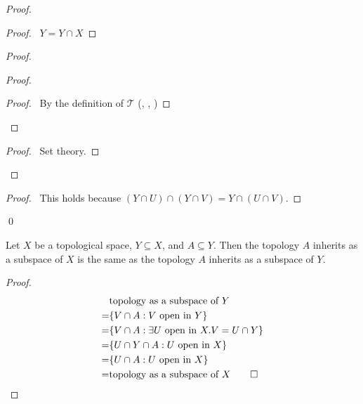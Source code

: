 \begin{proof}
  \pf
  \begin{proof}
    \pf\ $Y = Y \cap X$
  \end{proof}
  \begin{proof}
    \begin{proof}
      \begin{proof}
        \pf\ By the definition of $\mathcal{T}$ (,
        ,
        )
      \end{proof}
    \end{proof}
    \begin{proof}
      \pf\ Set theory.
    \end{proof}
  \end{proof}
  \begin{proof}
    \pf\ This holds because $(Y \cap U) \cap (Y \cap V) = Y \cap (U \cap V)$.
  \end{proof}
  \qed
\end{proof}

\begin{lm}
  Let $X$ be a topological space, $Y \subseteq X$, and $A \subseteq Y$. Then
  the
  topology $A$ inherits as a subspace of $X$ is the same as the topology $A$
  inherits as a subspace of $Y$.
\end{lm}

\begin{proof}
  \pf
  \begin{align*}
    & \text{topology as a subspace of } Y \\
    = & \{ V \cap A : V \text{ open in } Y \} \\
    = & \{ V \cap A : \exists U \text{ open in } X. V = U \cap Y \} \\
    = & \{ U \cap Y \cap A : U \text{ open in } X \} \\
    = & \{ U \cap A : U \text{ open in } X \} \\
    = & \text{topology as a subspace of } X \qed
  \end{align*}
\end{proof}

